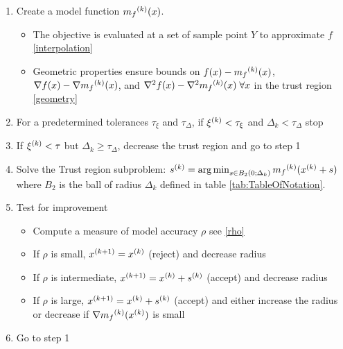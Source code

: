 \begin{enumerate}
	\item Create a model function ${{m}_f}^{(k)}(x)$.
	\begin {itemize}
        \item The objective is evaluated at a set of sample point $Y$ to approximate $f$ \ref{interpolation}
        \item Geometric properties ensure bounds on $f(x) - {{m}_f}^{(k)}(x)$, $\nabla f(x) - \nabla{{m}_f}^{(k)}(x)$, and $\nabla^2 f(x) - \nabla^2{{m}_f}^{(k)}(x)\;\forall x$ in the trust region \ref{geometry}
	\end{itemize}
	
	\item For a predetermined tolerances $\tau_{\xi}$ and $\tau_{\Delta}$, if ${\xi^{(k)}} < \tau_{\xi} $ and $\Delta_k<\tau_{\Delta}$ stop
	\item If ${\xi^{(k)}} < \tau$ but $\Delta_k\ge\tau_{\Delta}$, decrease the trust region and go to step 1
	
	\item Solve the Trust region subproblem: ${s}^{(k)} = \operatorname*{arg\,min}_{s\in B_2(0; \Delta_k)} {{m}_f}^{(k)} ({x}^{(k)} + s)$ where $B_2$ is the ball of radius $\Delta_k$ defined in table \ref{tab:TableOfNotation}.
	
	\item Test for improvement
	\begin{itemize}
		\item Compute a measure of model accuracy $\rho$ see \ref{rho}
		\item If $\rho$ is small, ${x}^{(k+1)}={x}^{(k)}$ (reject) and decrease radius
		\item If $\rho$ is intermediate, ${x}^{(k+1)}={x}^{(k)}+{s}^{(k)}$ (accept) and decrease radius
		\item If $\rho$ is large, ${x}^{(k+1)}={x}^{(k)}+{s}^{(k)}$ (accept) and either increase the radius or decrease if $\nabla {{m}_f}^{(k)}({x}^{(k)})$ is small
	\end{itemize}
	
	\item Go to step 1
\end{enumerate}

